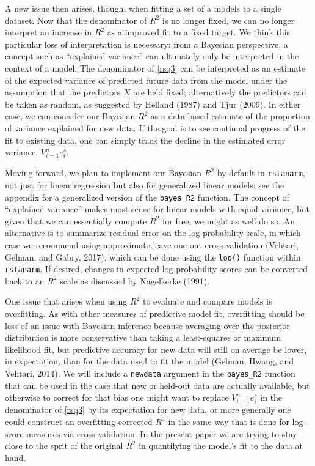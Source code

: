\documentclass[11pt]{article}
\begin{document}
A new issue then arises, though, when fitting a set of a models to a single
dataset.  Now that the denominator of $R^2$ is no longer fixed, we can no longer
interpret an increase in $R^2$ as a improved fit to a fixed target.  We think
this particular loss of interpretation is necessary:  from a Bayesian
perspective, a concept such as ``explained variance'' can ultimately only be
interpreted in the context of a model.  The denominator of \eqref{rsq3} can be
interpreted as an estimate of the expected variance of predicted future data
from the model under the assumption that the predictors $X$ are held fixed;
alternatively the predictors can be taken as random, as suggested by Helland
(1987) and Tjur (2009).  In either case, we can consider our Bayesian $R^2$ as a
data-based estimate of the proportion of variance explained for new data. If the
goal is to see continual progress of the fit to existing data, one can simply
track the decline in the estimated error variance, $V_{i=1}^n e_i^s$.

Moving forward, we plan to implement our Bayesian $R^2$ by default in
{\tt rstanarm}, not just for linear regression but also for generalized linear
models; see the appendix for a generalized version of the
\verb#bayes_R2# function. The concept of ``explained variance'' makes most
sense for linear models with equal variance, but given that we can essentially
compute $R^2$ for free, we might as well do so.  An alternative is to summarize
residual error on the log-probability scale, in which case we recommend using
approximate leave-one-out cross-validation (Vehtari, Gelman, and Gabry, 2017),
which can be done using the {\tt loo()} function within {\tt rstanarm}.   If
desired, changes in expected log-probability scores can be converted back to an
$R^2$ scale as discussed by Nagelkerke (1991).

One issue that arises when using $R^2$ to evaluate and compare models is
overfitting.  As with other measures of predictive model fit, overfitting should
be less of an issue with Bayesian inference because averaging over the posterior
distribution is more conservative than taking a least-squares or maximum
likelihood fit, but predictive accuracy for new data will still on average be
lower, in expectation, than for the data used to fit the model (Gelman, Hwang,
and Vehtari, 2014).   We will include a {\tt newdata} argument in the \verb#bayes_R2# 
function  that can be used in the case that new or held-out data are actually 
available, but otherwise to correct for that bias one might want to replace
$V_{i=1}^n e_i^s$ in the denominator of \eqref{rsq3} by its expectation for new
data, or more generally one could construct an overfitting-corrected $R^2$ in
the same way that is done for log-score measures via cross-validation. 
In the present paper we are trying to stay close to the sprit of the original $R^2$ in
quantifying the model's fit to the data at hand.
\end{document}
